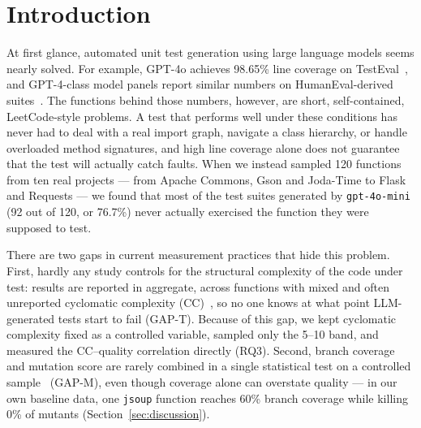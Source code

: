 \section{Introduction}\label{sec:intro}

At first glance, automated unit test generation using large language models seems nearly
solved. For example, GPT-4o achieves 98.65\% line coverage on
TestEval~\cite{wang2025testeval}, and GPT-4-class model panels report similar numbers on
HumanEval-derived suites~\cite{kumar2025empirical}. The functions behind those numbers,
however, are short, self-contained, LeetCode-style problems. A test that performs well
under these conditions has never had to deal with a real import graph, navigate a class
hierarchy, or handle overloaded method signatures, and high line coverage alone does not
guarantee that the test will actually catch faults. When we instead sampled 120 functions
from ten real projects --- from Apache Commons, Gson and Joda-Time to Flask and Requests
--- we found that most of the test suites generated by \texttt{gpt-4o-mini} (92 out of
120, or 76.7\%) never actually exercised the function they were supposed to test.

There are two gaps in current measurement practices that hide this problem. First, hardly
any study controls for the structural complexity of the code under test: results are
reported in aggregate, across functions with mixed and often unreported cyclomatic
complexity (CC)~\cite{wang2025testeval,jain2025testgeneval,zhang2024testbench}, so no one
knows at what point LLM-generated tests start to fail (GAP-T).
Because of this gap, we kept cyclomatic complexity fixed as a controlled variable, sampled
only the 5--10 band, and measured the CC--quality correlation directly (RQ3). Second,
branch coverage and mutation score are rarely combined in a single statistical test on a
controlled sample~\cite{sapozhnikov2024empirical,ouedraogo2025prompt,silva2025comparative}
(GAP-M), even though coverage alone can overstate quality --- in our own
baseline data, one \texttt{jsoup} function reaches 60\% branch coverage while killing 0\%
of mutants (Section~\ref{sec:discussion}).

